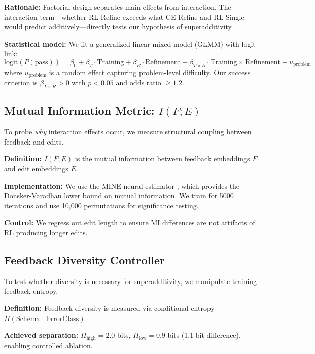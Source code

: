 \textbf{Rationale:} Factorial design separates main effects from interaction. The interaction term---whether RL-Refine exceeds what CE-Refine and RL-Single would predict additively---directly tests our hypothesis of superadditivity.

\textbf{Statistical model:} We fit a generalized linear mixed model (GLMM) with logit link:
\begin{equation}
\text{logit}(P(\text{pass})) = \beta_0 + \beta_T \cdot \text{Training} + \beta_R \cdot \text{Refinement} + \beta_{T \times R} \cdot \text{Training} \times \text{Refinement} + u_{\text{problem}}
\end{equation}
where $u_{\text{problem}}$ is a random effect capturing problem-level difficulty. Our success criterion is $\beta_{T \times R} > 0$ with $p < 0.05$ and odds ratio $\geq 1.2$.

\subsection{Mutual Information Metric: $I(F;E)$}

To probe \emph{why} interaction effects occur, we measure structural coupling between feedback and edits.

\textbf{Definition:} $I(F;E)$ is the mutual information between feedback embeddings $F$ and edit embeddings $E$.

\textbf{Implementation:} We use the MINE neural estimator \citep{belghazi2018mine}, which provides the Donsker-Varadhan lower bound on mutual information. We train for 5000 iterations and use 10,000 permutations for significance testing.

\textbf{Control:} We regress out edit length to ensure MI differences are not artifacts of RL producing longer edits.

\subsection{Feedback Diversity Controller}

To test whether diversity is necessary for superadditivity, we manipulate training feedback entropy.

\textbf{Definition:} Feedback diversity is measured via conditional entropy $H(\text{Schema} \mid \text{ErrorClass})$.

\textbf{Achieved separation:} $H_{\text{high}} = 2.0$ bits, $H_{\text{low}} = 0.9$ bits (1.1-bit difference), enabling controlled ablation.
